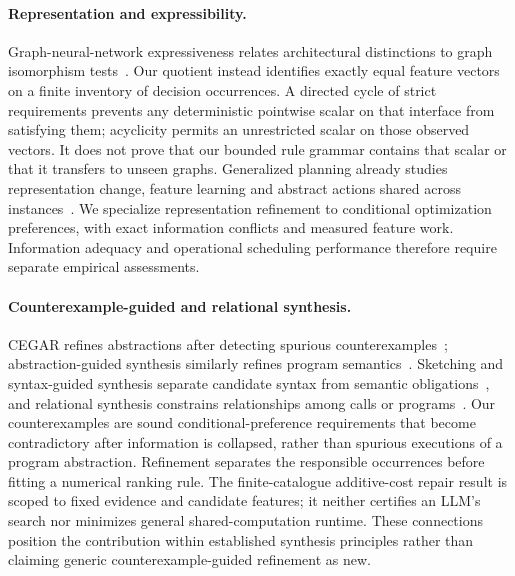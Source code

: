 \paragraph{Representation and expressibility.}
Graph-neural-network expressiveness relates architectural distinctions to
graph isomorphism tests~\cite{xu2019powerful,morris2019weisfeiler}. Our quotient
instead identifies exactly equal feature vectors on a finite inventory of
decision occurrences. A directed cycle of strict requirements prevents any
deterministic pointwise scalar on that interface from satisfying them;
acyclicity permits an unrestricted scalar on those observed vectors. It
does not prove that our bounded rule grammar contains that scalar or that
it transfers to unseen graphs. Generalized planning already studies
representation change, feature learning and abstract actions shared across
instances~\cite{bonet2018representation,bonet2019features,frances2021policies}.
We specialize representation refinement to conditional optimization
preferences, with exact information conflicts and measured feature work.
Information adequacy and operational scheduling performance therefore require
separate empirical assessments.

\paragraph{Counterexample-guided and relational synthesis.}
CEGAR refines abstractions after detecting spurious
counterexamples~\cite{clarke2000cegar}; abstraction-guided synthesis similarly
refines program semantics~\cite{wang2018abstraction}. Sketching and
syntax-guided synthesis separate candidate syntax from semantic
obligations~\cite{solarlezama2006sketch,alur2013sygus}, and relational synthesis
constrains relationships among calls or programs~\cite{wang2018relational}.
Our counterexamples are sound conditional-preference requirements that
become contradictory after information is collapsed, rather than spurious
executions of a program abstraction. Refinement separates the responsible
occurrences before fitting a numerical ranking rule. The finite-catalogue
additive-cost repair result is scoped to fixed evidence and candidate
features; it neither certifies an LLM's search nor minimizes general
shared-computation runtime. These connections position the contribution
within established synthesis principles rather than claiming generic
counterexample-guided refinement as new.

